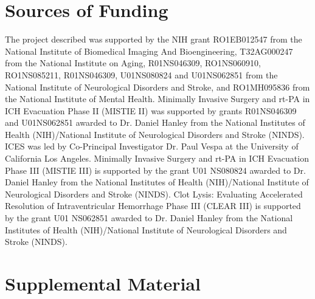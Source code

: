 \documentclass{elsarticle_nonatbib}\usepackage[]{graphicx}\usepackage[]{color}
\begin{document}
\section*{Sources of Funding}
The project described was supported by the NIH grant RO1EB012547 from the National Institute of Biomedical Imaging And Bioengineering, T32AG000247 from the National Institute on Aging, R01NS046309, RO1NS060910, RO1NS085211, R01NS046309, U01NS080824 and U01NS062851 from the National Institute of Neurological Disorders and Stroke, and RO1MH095836 from the National Institute of Mental Health. Minimally Invasive Surgery and rt-PA in ICH Evacuation Phase II (MISTIE II) was supported by grants R01NS046309 and U01NS062851 awarded to Dr. Daniel Hanley from the National Institutes of Health (NIH)/National Institute of Neurological Disorders and Stroke (NINDS).  ICES was led by Co-Principal Investigator Dr. Paul Vespa at the University of California Los Angeles. Minimally Invasive Surgery and rt-PA in ICH Evacuation Phase III (MISTIE III) is supported by the grant U01 NS080824 awarded to Dr. Daniel Hanley from the National Institutes of Health (NIH)/National Institute of Neurological Disorders and Stroke (NINDS). Clot Lysis: Evaluating Accelerated Resolution of Intraventricular Hemorrhage Phase III (CLEAR III) is supported by the grant U01 NS062851 awarded to Dr. Daniel Hanley from the National Institutes of Health (NIH)/National Institute of Neurological Disorders and Stroke (NINDS). 

\newpage
%
%
%
\printbibliography

\clearpage
\section{Supplemental Material}
\end{document}
